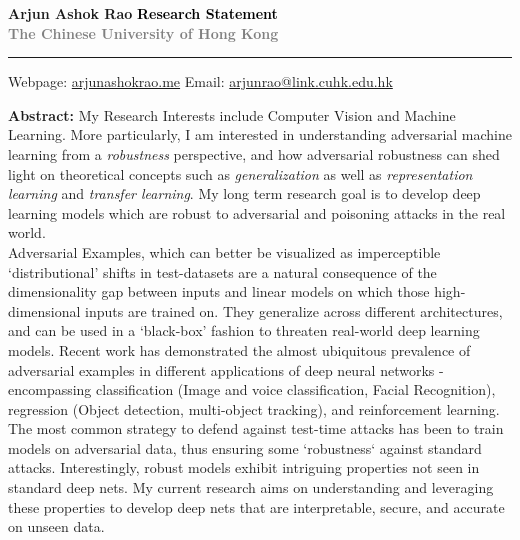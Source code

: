 \documentclass[12pt]{article}
\newcommand{\HRule}[1][\medskipamount]{\par
  \vspace*{\dimexpr-\parskip-\baselineskip+#1}
  \noindent\rule{\linewidth}{0.3mm}\par
  \vspace*{\dimexpr-\parskip-.3\baselineskip+#1}}
\begin{document}
\thispagestyle{empty}
\Large \textbf{Arjun Ashok Rao} \hfill \Large  \textbf{\textcolor{black}{\Large{Research Statement} }} \\ \textcolor{gray}{\textbf{\hspace*{0.25in}\normalsize{The Chinese University of Hong Kong}}}
\HRule

\small Webpage: \href{https://arjunashokrao.me}{arjunashokrao.me} \quad Email: \href{mailto:arjunrao@link.cuhk.edu.hk}{arjunrao@link.cuhk.edu.hk}

\bigskip

\textbf{Abstract:} My Research Interests include Computer Vision and Machine Learning. More particularly, I am interested in understanding adversarial machine learning from a \emph{robustness} perspective, and how adversarial robustness can shed light on theoretical concepts such as \emph{generalization} as well as \emph{representation learning} and \emph{transfer learning}. My long term research goal is to develop deep learning models which are robust to adversarial and poisoning attacks in the real world.  \\

Adversarial Examples, which can better be visualized as imperceptible `distributional' shifts in test-datasets are a natural consequence of the dimensionality gap between inputs and linear models on which those high-dimensional inputs are trained on.
They generalize across different architectures, and can be used in a `black-box' fashion to threaten real-world deep learning models. Recent work has demonstrated the almost ubiquitous prevalence of adversarial examples in different applications of deep neural networks - encompassing classification (Image and voice classification, Facial Recognition), regression (Object detection, multi-object tracking), and reinforcement learning. The most common strategy to defend against test-time attacks has been to train models on adversarial data, thus ensuring some `robustness` against standard attacks. Interestingly, robust models exhibit intriguing properties not seen in standard deep nets. My current research aims on understanding and leveraging these properties to develop deep nets that are interpretable, secure, and accurate on unseen data. 
    \\
\end{document}
